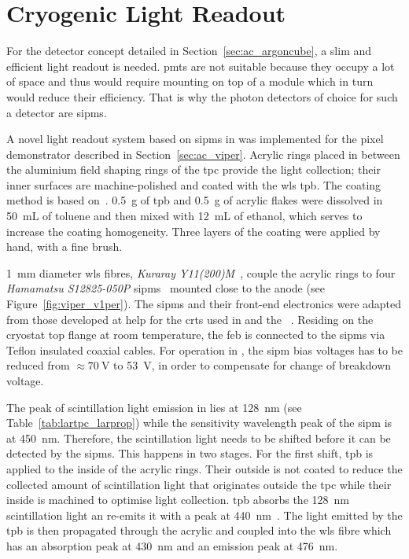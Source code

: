 \section{Cryogenic  Light Readout}
\label{sec:studies_viper-light-ro}

For the \AC{} detector concept detailed in Section~\ref{sec:ac_argoncube}, a slim and efficient light readout is needed.
\glspl{pmt} are not suitable because they occupy a lot of space and thus would require mounting on top of a module which in turn would reduce their efficiency.
That is why the photon detectors of choice for such a detector are \glspl{sipm}.

A novel light readout system based on \glspl{sipm} in \lar{} was implemented for the \AC{} pixel demonstrator described in Section~\ref{sec:ac_viper}.
Acrylic rings placed in between the aluminium field shaping rings of the \gls{tpc} provide the light collection; their inner surfaces are machine-polished and coated with the \gls{wls} \gls{tpb}. 
The coating method is based on~\cite{TPBcoating}.
\SI{0.5}{\gram} of \gls{tpb} and \SI{0.5}{\gram} of acrylic flakes were dissolved in \SI{50}{\milli\liter} of toluene and then mixed with \SI{12}{\milli\liter} of ethanol, which serves to increase the coating homogeneity. 
Three layers of the coating were applied by hand, with a fine brush. 

\SI{1}{\milli\metre} diameter \gls{wls} fibres, \emph{Kuraray Y11(200)M}~\cite{kuraray}, couple the acrylic rings to four \emph{Hamamatsu S12825-050P} \glspl{sipm}~\cite{crt_sipm} mounted close to the anode (see Figure~\ref{fig:viper_v1per}). 
The \glspl{sipm} and their front-end electronics were adapted from those developed at \gls{help} for the \glspl{crt} used in \uboone{} and the \sbnd{}~\cite{crt, crt_feb}.
Residing on the cryostat top flange at room temperature, the \gls{feb} is connected to the \glspl{sipm} via Teflon insulated coaxial cables.
For operation in \lar{}, the \gls{sipm} bias voltages has to be reduced from $\approx \SI{70}{\volt}$ to \SI{53}{\volt}, in order to compensate for change of breakdown voltage.

The peak of scintillation light emission in \lar{} lies at \SI{128}{\nano\metre} (see Table~\ref{tab:lartpc_larprop}) while the sensitivity wavelength peak of the \gls{sipm} is at \SI{450}{\nano\metre}.
Therefore, the scintillation light needs to be shifted before it can be detected by the \glspl{sipm}.
This happens in two stages.
For the first shift, \gls{tpb} is applied to the inside of the acrylic rings.
Their outside is not coated to reduce the collected amount of scintillation light that originates outside the \gls{tpc} while their inside is machined to optimise light collection.
\gls{tpb} absorbs the \SI{128}{\nano\metre} scintillation light an re-emits it with a peak at \SI{440}{\nano\metre}~\cite{tpb}.
The light emitted by the \gls{tpb} is then propagated through the acrylic and coupled into the \gls{wls} fibre which has an absorption peak at \SI{430}{\nano\metre} and an emission peak at \SI{476}{\nano\metre}.

